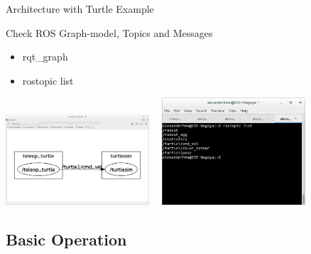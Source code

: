 \documentclass[10pt]{beamer}
\begin{document}
 \begin{frame}{Architecture with Turtle Example}
  \begin{block}{Check ROS Graph-model, Topics and Messages}
   \begin{itemize}
    \item rqt\_graph
    \item rostopic list
   \end{itemize}
  \end{block}
  \begin{center}
   \includegraphics[width=0.4\textwidth]{rosgraph.png}~~
   \includegraphics[width=0.4\textwidth]{rostopics.png}
  \end{center}
 \end{frame}
 
 \subsection{Basic Operation}
 
\end{document}
